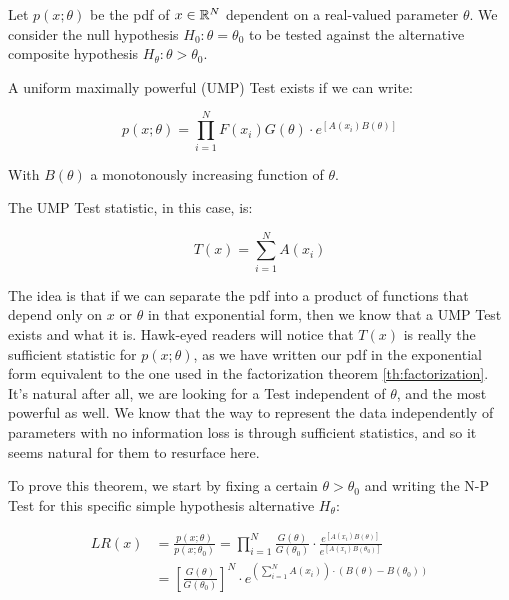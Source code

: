 \begin{theorem}
	Let $p(x;\theta)$ be the pdf of $x\in\mathbb{R}^N$ dependent on a real-valued parameter $\theta$. We consider the null hypothesis $H_0: \theta= \theta_0$ to be tested against the alternative composite hypothesis $H_\theta : \theta > \theta_0$.
	
	A uniform maximally powerful (UMP) Test exists if we can write:
	
	\[
	p(x;\theta) = \prod_{i=1}^N F(x_i)G(\theta)\cdot e^{\left[A(x_i)B(\theta)\right]}
	\] 
	
	With $B(\theta)$ a monotonously increasing function of $\theta$.
	
	The UMP Test statistic, in this case, is:
	
	\[
	T(x) = \sum_{i=1}^NA(x_i)
	\]
\end{theorem}

The idea is that if we can separate the pdf into a product of functions that depend only on $x$ or $\theta$ in that exponential form, then we know that a UMP Test exists and what it is. Hawk-eyed readers will notice that $T(x)$ is really the sufficient statistic for $p(x;\theta)$, as we have written our pdf in the exponential form equivalent to the one used in the factorization theorem \ref{th:factorization}. It's natural after all, we are looking for a Test independent of $\theta$, and the most powerful as well. We know that the way to represent the data independently of parameters with no information loss is through sufficient statistics, and so it seems natural for them to resurface here.

To prove this theorem, we start by fixing a certain $\theta>\theta_0$ and writing the N-P Test for this specific simple hypothesis alternative $H_\theta$:

\begin{align*}
	LR(x) &= \frac{p(x;\theta)}{p(x;\theta_0)} = \prod_{i=1}^N \frac{G(\theta)}{G(\theta_0)}\cdot \frac{e^{\left[A(x_i)B(\theta)\right]}}{e^{\left[A(x_i)B(\theta_0)\right]}}\\
	&=\left[\frac{G(\theta)}{G(\theta_0)}\right]^N\cdot e^{\left(\sum_{i=1}^N A(x_i)\right)\cdot\left(B(\theta)-B(\theta_0)\right)}
\end{align*}

